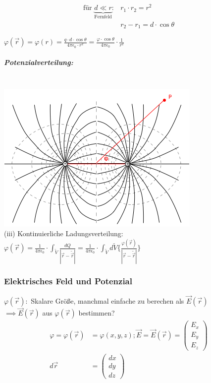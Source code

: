 \documentclass[11pt]{article}
\begin{document}
\begin{align*}
	\text{für } \underbrace{d\ll r}_{\text{Fernfeld}}:& r_1\cdot r_2 = r^2\\
	&r_2-r_1=d\cdot\cos\theta
\end{align*}

$ \varphi(\vec{r})=\varphi(r)=\frac{q\cdot d\cdot \cos\theta}{4\pi\epsilon_0\cdot r^2} = \frac{\varphi\cdot\cos\theta}{4\pi\epsilon_0}\cdot\frac{1}{r^2} $

\subparagraph{Potenzialverteilung:}
\hfill\\
\includegraphics{skizzen/14/14_7B1}
\\
(iii) Kontinuierliche Ladungsverteilung:\\

$ \displaystyle\varphi(\vec{r})=\frac{1}{4\pi\epsilon_0}\cdot\int_{\tilde{V}} \frac{dQ}{|\vec{r}-\tilde{\vec{r}}|} = \frac{1}{4\pi\epsilon_0}\cdot\int_{\tilde{V}} d\tilde{V}\bigg\{\frac{\varphi(\vec{r})}{|\vec{r}-\tilde{\vec{r}}|}\bigg\}$\\

\subsubsection{Elektrisches Feld und Potenzial}

$ \varphi(\vec{r}): $ Skalare Größe, manchmal einfache zu berechen als $ \vec{E}(\vec{r}) $\\

$\implies \vec{E}(\vec{r}) $ aus $ \varphi(\vec{r}) $ bestimmen?\\

\begin{align*}
	\varphi=\varphi(\vec{r}) &= \varphi(x,y,z); \vec{E}= \vec{E}(\vec{r})=\begin{pmatrix}E_x\\ E_y\\ E_z\end{pmatrix}\\
	d\vec{r}&= \begin{pmatrix}dx\\ dy\\ dz\end{pmatrix}
\end{align*}
\end{document}
